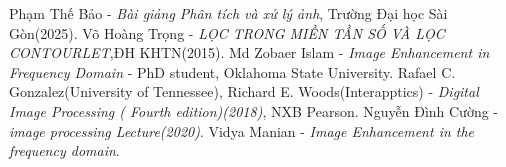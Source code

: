 \documentclass[12pt,a4paper]{report}
\numberwithin{equation}{section}
\theoremstyle{definition} %
\begin{document}
	
	\begin{thebibliography}{99}
		\thispagestyle{fancy}
		
		
		
		

		
		 Phạm Thế Bảo - \textit{Bài giảng Phân tích và xử lý ảnh}, Trường Đại học Sài Gòn(2025).
		 Võ Hoàng Trọng - \textit{LỌC TRONG MIỀN TẦN SỐ VÀ LỌC CONTOURLET},ĐH KHTN(2015).
		 Md Zobaer Islam -  \textit{Image Enhancement in Frequency Domain} - PhD student, Oklahoma State University.
		Rafael C. Gonzalez(University of Tennessee), Richard E. Woods(Interapptics) - \textit{Digital Image
 Processing ( Fourth edition)(2018)}, NXB Pearson.
  Nguyễn Đình Cường -  \textit{image processing Lecture(2020)}.
		Vidya Manian - \textit{Image Enhancement in the frequency 
domain}.
		
		
		
		
		
		
		
		
	\end{thebibliography}
	
	\newpage %
	
	\thispagestyle{empty} %

	\mbox{}
\end{document}
